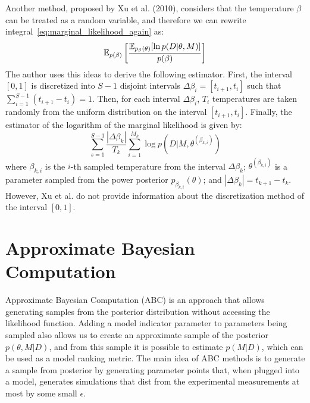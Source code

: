 Another method, proposed by Xu et al. (2010), considers that the 
temperature $\beta$ can be treated as a random variable, and therefore 
we can rewrite integral~\ref{eq:marginal_likelihood_again} as:
\begin{equation}
    \mathbb{E}_{p (\beta)} 
        \left[\frac
            {\mathbb{E}_{p_\beta (\theta)}[\ln p(D|\theta, M)]}
            {p (\beta)}
        \right]
\end{equation}
The author uses this ideas to derive the following estimator. First, 
the interval $[0, 1]$ is discretized into $S - 1$ disjoint intervals 
$\Delta\beta_i = [t_{i + 1}, t_i]$ such that  $\sum_{i = 1}^{S - 1} 
(t_{i + 1} - t_{i}) = 1$. Then, for each interval $\Delta\beta_i$, $T_i$ 
temperatures are taken randomly from the uniform distribution on the 
interval $[t_{i + 1}, t_i]$. Finally, the estimator of the logarithm of
the marginal likelihood is given by:
\begin{equation}
    \sum_{s = 1}^{S - 1}\frac{|\Delta\beta_k|}
                             {T_k}
        \sum_{i = 1}^{M_k} \log p (D | M, \theta^{(\beta_{k, i})})
\end{equation}
where $\beta_{k, i}$ is the $i$-th sampled temperature from the interval
$\Delta\beta_k$; $\theta^{(\beta_{k, i})}$ is a parameter sampled 
from the power posterior $p_{\beta_{k, i}} (\theta)$; and 
$|\Delta\beta_k| = t_{k + 1} - t_k$. However, Xu et al. do not provide
information about the discretization method of the interval $[0, 1]$.



\section{Approximate Bayesian Computation}
Approximate Bayesian Computation (ABC) is an approach that allows 
generating samples from the posterior distribution without accessing the
likelihood function. Adding a model indicator parameter to parameters 
being sampled also allows us to create an approximate sample of the 
posterior $p (\theta, M | D)$, and from this sample it is possible to 
estimate $p (M | D)$, which can be used as a model ranking metric. The 
main idea of ABC methods is to generate a sample from posterior by 
generating parameter points that, when plugged into a model, generates 
simulations that dist from the experimental measurements at most by some
small $\epsilon$.

